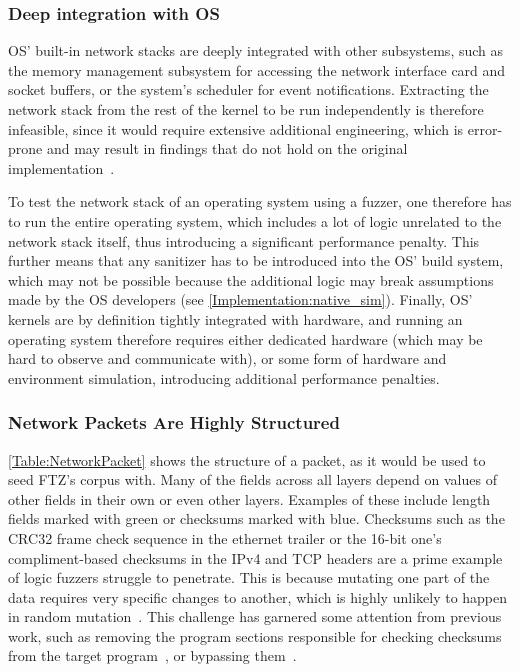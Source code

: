 \documentclass[twocolumn]{article}
\newcommand{\proj}{FTZ\xspace}
\let\savedCite=\cite
\renewcommand{\cite}{\unskip~\savedCite}
\begin{document}
\subsubsection{Deep integration with OS}

OS' built-in network stacks are deeply integrated with other subsystems, such as the memory management subsystem for accessing the network interface card and socket buffers, or the system's scheduler for event notifications. Extracting the network stack from the rest of the kernel to be run independently is therefore infeasible, since it would require extensive additional engineering, which is error-prone and may result in findings that do not hold on the original implementation\cite{KernelVsUserNetworking}.

To test the network stack of an operating system using a fuzzer, one therefore has to run the entire operating system, which includes a lot of logic unrelated to the network stack itself, thus introducing a significant performance penalty. This further means that any sanitizer has to be introduced into the OS' build system, which may not be possible because the additional logic may break assumptions made by the OS developers (see \cref{Implementation:native_sim}). Finally, OS' kernels are by definition tightly integrated with hardware, and running an operating system therefore requires either dedicated hardware (which may be hard to observe and communicate with), or some form of hardware and environment simulation, introducing additional performance penalties.

\subsubsection{Network Packets Are Highly Structured}
\label{Background:TcpIsStructured}

\cref{Table:NetworkPacket} shows the structure of a packet, as it would be used to seed \proj's corpus with. Many of the fields across all layers depend on values of other fields in their own or even other layers. Examples of these include length fields marked with green or checksums marked with blue. Checksums such as the CRC32 frame check sequence in the ethernet trailer or the 16-bit one's compliment-based checksums in the IPv4 and TCP headers are a prime example of logic fuzzers struggle to penetrate. This is because mutating one part of the data requires very specific changes to another, which is highly unlikely to happen in random mutation\cite{StateOfTheArt}. This challenge has garnered some attention from previous work, such as removing the program sections responsible for checking checksums from the target program\cite{TFuzz}, or bypassing them\cite{REDQUEEN}.
\end{document}
